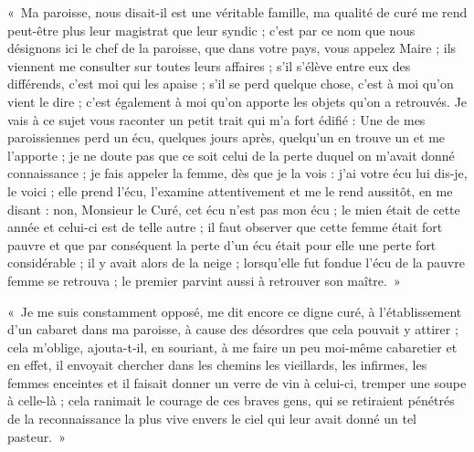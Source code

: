\documentclass[11pt,a4paper]{report}
\begin{document}
«~Ma paroisse, nous disait-il est une véritable famille, ma qualité de curé me rend peut-être plus leur magistrat que leur syndic ; c'est par ce nom que nous désignons ici le chef de la paroisse, que dans votre pays, vous appelez Maire ; ils viennent me consulter sur toutes leurs affaires ; s'il s'élève entre eux des différends, c'est moi qui les apaise ; s'il se perd quelque chose, c'est à moi qu'on vient le dire ; c'est également à moi qu'on apporte les objets qu'on a retrouvés. Je vais à ce sujet vous raconter un petit trait qui m'a fort édifié : Une de mes paroissiennes perd un écu, quelques jours après, quelqu'un en trouve un et me l'apporte ; je ne doute pas que ce soit celui de la perte duquel on m'avait donné connaissance ; je fais appeler la femme, dès que je la vois : j'ai votre écu lui dis-je, le voici ; elle prend l'écu, l'examine attentivement et me le rend aussitôt, en me disant : non, Monsieur le Curé, cet écu n'est pas mon écu ; le mien était de cette année et celui-ci est de telle autre ; il faut observer que cette femme était fort pauvre et que par conséquent la perte d'un écu était pour elle une perte fort considérable ; il y avait alors de la neige ; lorsqu'elle fut fondue l'écu de la pauvre femme se retrouva ; le premier parvint aussi à retrouver son maître.~»

«~Je me suis constamment opposé, me dit encore ce digne curé, à l'établissement d'un cabaret dans ma paroisse, à cause des désordres que cela pouvait y attirer ; cela m'oblige, ajouta-t-il, en souriant, à me faire un peu moi-même cabaretier et en effet, il envoyait chercher dans les chemins les vieillards, les infirmes, les femmes enceintes et il faisait donner un verre de vin à celui-ci, tremper une soupe à celle-là ; cela ranimait le courage de ces braves gens, qui se retiraient pénétrés de la reconnaissance la plus vive envers le ciel qui leur avait donné un tel pasteur.~»
\end{document}
